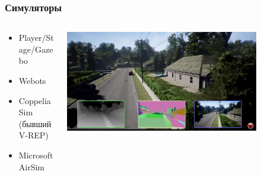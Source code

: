 \documentclass{../../slides-style}
\begin{document}
    \begin{frame}
        \frametitle{Симуляторы}
        \begin{columns}
            \begin{column}{0.5\textwidth}
                \begin{itemize}
                    \item Player/Stage/Gazebo
                    \item Webots
                    \item CoppeliaSim (бывший V-REP)
                    \item Microsoft AirSim
                \end{itemize}
            \end{column}
            \begin{column}{0.5\textwidth}
                \begin{center}
                    \includegraphics[width=0.8\textwidth]{airSim.png}
                \end{center}
            \end{column}
        \end{columns}
    \end{frame}
\end{document}
